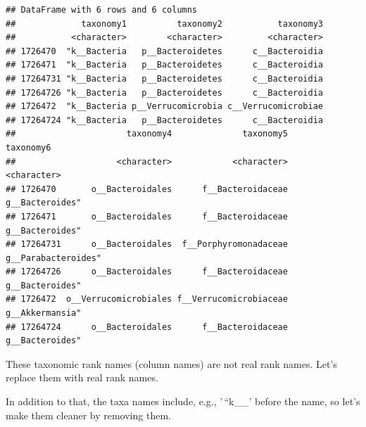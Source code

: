\documentclass[
]{book}
\begin{document}
\begin{verbatim}
## DataFrame with 6 rows and 6 columns
##             taxonomy1          taxonomy2           taxonomy3
##           <character>        <character>         <character>
## 1726470  "k__Bacteria   p__Bacteroidetes      c__Bacteroidia
## 1726471  "k__Bacteria   p__Bacteroidetes      c__Bacteroidia
## 17264731 "k__Bacteria   p__Bacteroidetes      c__Bacteroidia
## 17264726 "k__Bacteria   p__Bacteroidetes      c__Bacteroidia
## 1726472  "k__Bacteria p__Verrucomicrobia c__Verrucomicrobiae
## 17264724 "k__Bacteria   p__Bacteroidetes      c__Bacteroidia
##                      taxonomy4              taxonomy5           taxonomy6
##                    <character>            <character>         <character>
## 1726470       o__Bacteroidales      f__Bacteroidaceae     g__Bacteroides"
## 1726471       o__Bacteroidales      f__Bacteroidaceae     g__Bacteroides"
## 17264731      o__Bacteroidales  f__Porphyromonadaceae g__Parabacteroides"
## 17264726      o__Bacteroidales      f__Bacteroidaceae     g__Bacteroides"
## 1726472  o__Verrucomicrobiales f__Verrucomicrobiaceae     g__Akkermansia"
## 17264724      o__Bacteroidales      f__Bacteroidaceae     g__Bacteroides"
\end{verbatim}

These taxonomic rank names (column names) are not real rank
names. Let's replace them with real rank names.

In addition to that, the taxa names include, e.g., '\,``k\_\_' before the name, so let's
make them cleaner by removing them.
\end{document}
